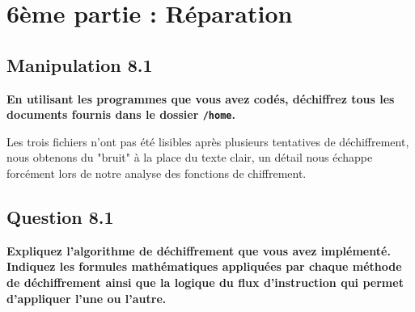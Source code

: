 \section{6ème partie : Réparation}

\subsection{Manipulation 8.1}
\textbf{En utilisant les programmes que vous avez codés, déchiffrez tous les documents fournis dans le dossier \texttt{/home}.}\newline

Les trois fichiers n'ont pas été lisibles après plusieurs tentatives de déchiffrement, nous obtenons du "bruit" à la place du texte clair, un détail nous échappe forcément lors de notre analyse des fonctions de chiffrement. 

\subsection{Question 8.1}
\textbf{Expliquez l'algorithme de déchiffrement que vous avez implémenté. Indiquez les formules mathématiques appliquées par chaque méthode de déchiffrement ainsi que la logique du flux d'instruction qui permet d'appliquer l'une ou l'autre.}\newline

